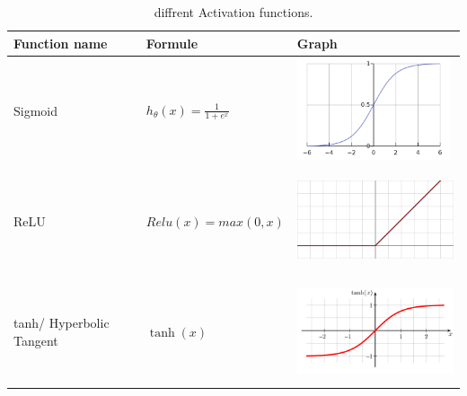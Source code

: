 \documentclass[runningheads]{llncs}
\begin{document}
\begin{table}
    \caption{diffrent Activation functions.}\label{tab1}
    \begin{tabular}{|l|l|l|}
    \hline
    Function name &  Formule & Graph\\
    \hline
    Sigmoid &  {$ h_ \theta (x) =  \frac{\mathrm{1} }{\mathrm{1} + e^{x} }  $ } &  \begin{minipage}{.3\textwidth}
        \includegraphics[width=\linewidth, height=30mm]{sigmoid}
      \end{minipage} \\
    ReLU &  {$Relu(x) = max(0,x) $} & \begin{minipage}{.3\textwidth}
        \includegraphics[width=\linewidth, height=30mm]{relu}
      \end{minipage}\\
    tanh/ Hyperbolic Tangent & {$\tanh({x})$} & \begin{minipage}{.3\textwidth}
        \includegraphics[width=\linewidth, height=30mm]{tanh}
      \end{minipage}\\
    \hline
    \end{tabular}
\end{table}





\end{document}
